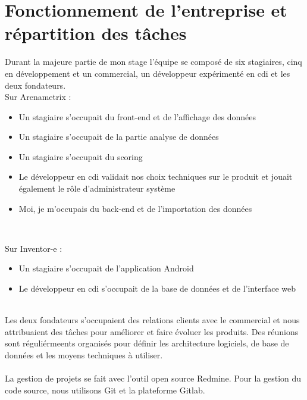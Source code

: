 \section{Fonctionnement de l'entreprise et répartition des tâches}
Durant la majeure partie de mon stage l'équipe se composé de six stagiaires, cinq en développement et un commercial, un développeur expérimenté en cdi et les deux fondateurs. \\

Sur Arenametrix : 
\begin{itemize}
  \item[\textbullet] Un stagiaire s'occupait du front-end et de l'affichage des données
  \item[\textbullet] Un stagiaire s'occupait de la partie analyse de données
  \item[\textbullet] Un stagiaire s'occupait du scoring
  \item[\textbullet] Le développeur en cdi validait nos choix techniques sur le produit et jouait également le rôle d'administrateur système
  \item[\textbullet]Moi, je m'occupais du back-end et de l'importation des données
\end{itemize} \

Sur Inventor-e : 
\begin{itemize}
  \item[\textbullet] Un stagiaire s'occupait de l'application Android
  \item[\textbullet] Le développeur en cdi s'occupait de la base de données et de l'interface web
\end{itemize}

\leavevmode
\\
Les deux fondateurs s'occupaient des relations clients avec le commercial et nous attribuaient des tâches pour améliorer et faire évoluer les produits. Des réunions sont réguliérmeents organisés pour définir les architecture logiciels, de base de données et les moyens techniques à utiliser. 
\\ \\
La gestion de projets se fait avec l'outil open source Redmine. Pour la gestion du code source, nous utilisons Git et la plateforme Gitlab.

